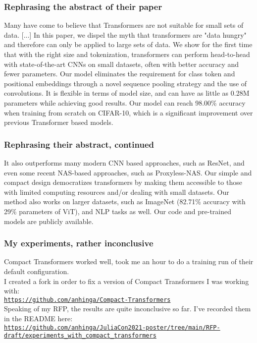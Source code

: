 \documentclass{beamer}
\begin{document}
\begin{frame}

\frametitle{Rephrasing the abstract of their paper}

{\footnotesize Many have come to believe that Transformers are not suitable for small sets of data. [...] In this paper, we dispel the myth that transformers are "data hungry" and therefore can only be applied to large sets of data. We show for the first time that with the right size and tokenization, transformers can perform head-to-head with state-of-the-art CNNs on small datasets, often with better accuracy and fewer parameters. Our model eliminates the requirement for class token and positional embeddings through a novel sequence pooling strategy and the use of convolutions. It is flexible in terms of model size, and can have as little as 0.28M parameters while achieving good results. Our model can reach 98.00\% accuracy when training from scratch on CIFAR-10, which is a significant improvement over previous Transformer based models.}

\end{frame}

\begin{frame}

\frametitle{Rephrasing their abstract, continued}

{\footnotesize It also outperforms many modern CNN based approaches, such as ResNet, and even some recent NAS-based approaches, such as Proxyless-NAS. Our simple and compact design democratizes transformers by making them accessible to those with limited computing resources and/or dealing with small datasets. Our method also works on larger datasets, such as ImageNet (82.71\% accuracy with 29\% parameters of ViT), and NLP tasks as well. Our code and pre-trained models are publicly available.}

\end{frame}


\begin{frame}

\frametitle{My experiments, rather inconclusive}

Compact Transformers worked well, took me an hour to do a training run of their default configuration.\\[2ex]

I created a fork in order to fix a version of Compact Transformers I was working with:\\[2ex]

\href{https://github.com/anhinga/Compact-Transformers}{\tt https://github.com/anhinga/Compact-Transformers}\\[2ex]

Speaking of my RFP, the results are quite inconclusive so far. I've recorded them in the README here:\\[2ex]

\href{https://github.com/anhinga/JuliaCon2021-poster/tree/main/RFP-draft/experiments\_with\_compact\_transformers}
{\tiny\tt https://github.com/anhinga/JuliaCon2021-poster/tree/main/RFP-draft/experiments\_with\_compact\_transformers}


\end{frame}
\end{document}
